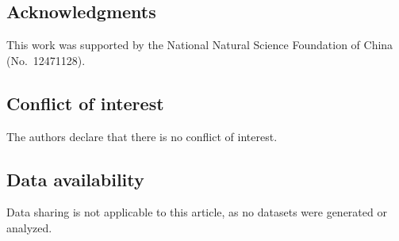 \documentclass[reqno]{amsart}
\numberwithin{equation}{section}
\theoremstyle{plain}
\theoremstyle{definition}
\theoremstyle{remark}
\begin{document}
\subsection*{Acknowledgments}
This work was supported by the National Natural Science Foundation of China
(No.~12471128).


\subsection*{Conflict of interest}
The authors declare that there is no conflict of interest.

\subsection*{Data availability}
Data sharing is not applicable to this article, as no datasets were generated
or analyzed.
\end{document}

